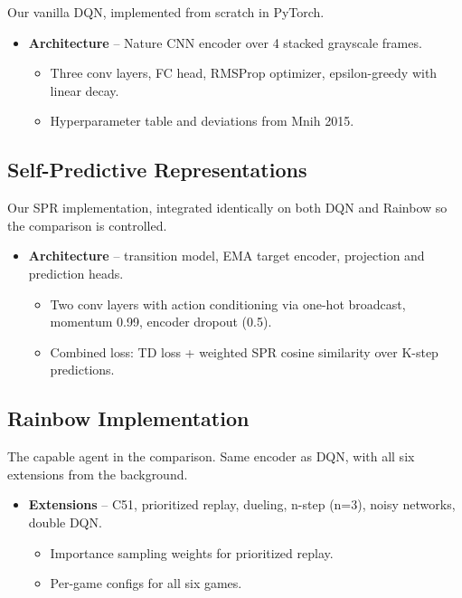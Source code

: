 \documentclass[11pt]{article}
\begin{document}
\noindent Our vanilla DQN, implemented from scratch in PyTorch.

\begin{itemize}
\item \textbf{Architecture} -- Nature CNN encoder over 4 stacked
  grayscale frames.
  \begin{itemize}[label=$\circ$, itemsep=0.2em, parsep=0pt, topsep=0pt, partopsep=0pt]
  \item Three conv layers, FC head, RMSProp optimizer,
    epsilon-greedy with linear decay.
  \item Hyperparameter table and deviations from Mnih 2015.
  \end{itemize}
\end{itemize}

\subsection{Self-Predictive Representations}

\noindent Our SPR implementation, integrated identically on both DQN
and Rainbow so the comparison is controlled.

\begin{itemize}
\item \textbf{Architecture} -- transition model, EMA target encoder,
  projection and prediction heads.
  \begin{itemize}[label=$\circ$, itemsep=0.2em, parsep=0pt, topsep=0pt, partopsep=0pt]
  \item Two conv layers with action conditioning via one-hot
    broadcast, momentum 0.99, encoder dropout (0.5).
  \item Combined loss: TD loss + weighted SPR cosine similarity
    over K-step predictions.
  \end{itemize}
\end{itemize}

\subsection{Rainbow Implementation}

\noindent The capable agent in the comparison. Same encoder as DQN,
with all six extensions from the background.

\begin{itemize}
\item \textbf{Extensions} -- C51, prioritized replay, dueling,
  n-step (n=3), noisy networks, double DQN.
  \begin{itemize}[label=$\circ$, itemsep=0.2em, parsep=0pt, topsep=0pt, partopsep=0pt]
  \item Importance sampling weights for prioritized replay.
  \item Per-game configs for all six games.
  \end{itemize}
\end{itemize}
\end{document}
